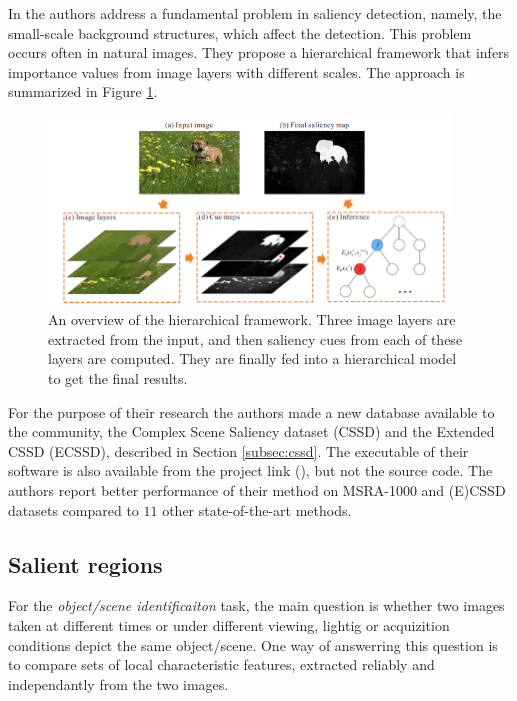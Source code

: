 In \cite{YanCVPR2013} the authors address a fundamental problem in saliency detection, namely, the small-scale background structures, which affect the detection. This problem occurs often in natural images. They propose a hierarchical framework that infers importance values from image layers with different scales. The approach is summarized in Figure \ref{fig:hier_yan13}.

\begin{figure}[H]
\begin{center}
\includegraphics[width=0.95\textwidth]{fig/Hierarchy_Yan13}
\end{center}
\caption{An overview of the hierarchical framework. Three image layers are extracted from the input, and then  saliency cues from each of these layers are computed. They are finally fed into a hierarchical model to get the final results.}
\label{fig:hier_yan13}
\end{figure}

For the purpose of their research the authors made a new database available to the community, the Complex Scene Saliency dataset (CSSD) and the Extended CSSD (ECSSD), described in Section \ref{subsec:cssd}. The executable of their software is also available from the project link (\cite{ecssd_db}), but not the source code. The authors report better performance of their method on MSRA-1000 and (E)CSSD datasets compared to $11$ other state-of-the-art methods.

\subsection{Salient regions}

For the {\em object/scene identificaiton} task, the main question is whether two images taken at different times or under different viewing, lightig or acquizition conditions depict the same object/scene. One way of answerring this question is to compare sets of local characteristic features, extracted reliably and independantly from the two images.

